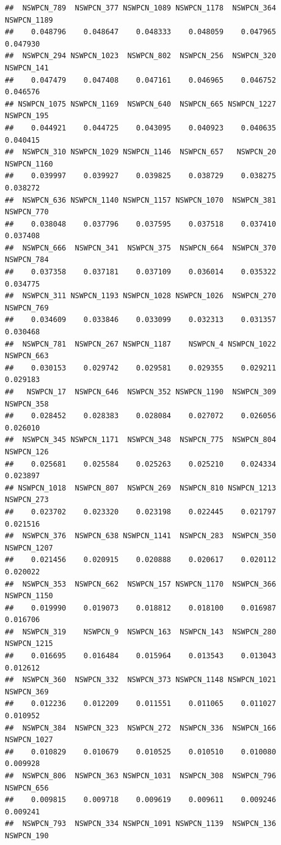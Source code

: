 \documentclass{article}\usepackage[]{graphicx}\usepackage[]{color}
\makeatletter
\newenvironment{kframe}{%
 \def\at@end@of@kframe{}%
 \ifinner\ifhmode%
  \def\at@end@of@kframe{\end{minipage}}%
  \begin{minipage}{\columnwidth}%
 \fi\fi%
 \def\FrameCommand##1{\hskip\@totalleftmargin \hskip-\fboxsep
 \colorbox{shadecolor}{##1}\hskip-\fboxsep
     \hskip-\linewidth \hskip-\@totalleftmargin \hskip\columnwidth}%
 \MakeFramed {\advance\hsize-\width
   \@totalleftmargin\z@ \linewidth\hsize
   \@setminipage}}%
 {\par\unskip\endMakeFramed%
 \at@end@of@kframe}
\newenvironment{knitrout}{}{} %
\makeatother
\begin{document}
\begin{knitrout}
\begin{kframe}
\begin{verbatim}
##  NSWPCN_789  NSWPCN_377 NSWPCN_1089 NSWPCN_1178  NSWPCN_364 NSWPCN_1189 
##    0.048796    0.048647    0.048333    0.048059    0.047965    0.047930 
##  NSWPCN_294 NSWPCN_1023  NSWPCN_802  NSWPCN_256  NSWPCN_320  NSWPCN_141 
##    0.047479    0.047408    0.047161    0.046965    0.046752    0.046576 
## NSWPCN_1075 NSWPCN_1169  NSWPCN_640  NSWPCN_665 NSWPCN_1227  NSWPCN_195 
##    0.044921    0.044725    0.043095    0.040923    0.040635    0.040415 
##  NSWPCN_310 NSWPCN_1029 NSWPCN_1146  NSWPCN_657   NSWPCN_20 NSWPCN_1160 
##    0.039997    0.039927    0.039825    0.038729    0.038275    0.038272 
##  NSWPCN_636 NSWPCN_1140 NSWPCN_1157 NSWPCN_1070  NSWPCN_381  NSWPCN_770 
##    0.038048    0.037796    0.037595    0.037518    0.037410    0.037408 
##  NSWPCN_666  NSWPCN_341  NSWPCN_375  NSWPCN_664  NSWPCN_370  NSWPCN_784 
##    0.037358    0.037181    0.037109    0.036014    0.035322    0.034775 
##  NSWPCN_311 NSWPCN_1193 NSWPCN_1028 NSWPCN_1026  NSWPCN_270  NSWPCN_769 
##    0.034609    0.033846    0.033099    0.032313    0.031357    0.030468 
##  NSWPCN_781  NSWPCN_267 NSWPCN_1187    NSWPCN_4 NSWPCN_1022  NSWPCN_663 
##    0.030153    0.029742    0.029581    0.029355    0.029211    0.029183 
##   NSWPCN_17  NSWPCN_646  NSWPCN_352 NSWPCN_1190  NSWPCN_309  NSWPCN_358 
##    0.028452    0.028383    0.028084    0.027072    0.026056    0.026010 
##  NSWPCN_345 NSWPCN_1171  NSWPCN_348  NSWPCN_775  NSWPCN_804  NSWPCN_126 
##    0.025681    0.025584    0.025263    0.025210    0.024334    0.023897 
## NSWPCN_1018  NSWPCN_807  NSWPCN_269  NSWPCN_810 NSWPCN_1213  NSWPCN_273 
##    0.023702    0.023320    0.023198    0.022445    0.021797    0.021516 
##  NSWPCN_376  NSWPCN_638 NSWPCN_1141  NSWPCN_283  NSWPCN_350 NSWPCN_1207 
##    0.021456    0.020915    0.020888    0.020617    0.020112    0.020022 
##  NSWPCN_353  NSWPCN_662  NSWPCN_157 NSWPCN_1170  NSWPCN_366 NSWPCN_1150 
##    0.019990    0.019073    0.018812    0.018100    0.016987    0.016706 
##  NSWPCN_319    NSWPCN_9  NSWPCN_163  NSWPCN_143  NSWPCN_280 NSWPCN_1215 
##    0.016695    0.016484    0.015964    0.013543    0.013043    0.012612 
##  NSWPCN_360  NSWPCN_332  NSWPCN_373 NSWPCN_1148 NSWPCN_1021  NSWPCN_369 
##    0.012236    0.012209    0.011551    0.011065    0.011027    0.010952 
##  NSWPCN_384  NSWPCN_323  NSWPCN_272  NSWPCN_336  NSWPCN_166 NSWPCN_1027 
##    0.010829    0.010679    0.010525    0.010510    0.010080    0.009928 
##  NSWPCN_806  NSWPCN_363 NSWPCN_1031  NSWPCN_308  NSWPCN_796  NSWPCN_656 
##    0.009815    0.009718    0.009619    0.009611    0.009246    0.009241 
##  NSWPCN_793  NSWPCN_334 NSWPCN_1091 NSWPCN_1139  NSWPCN_136  NSWPCN_190 

\end{verbatim}
\end{kframe}
\end{knitrout}
\end{document}
